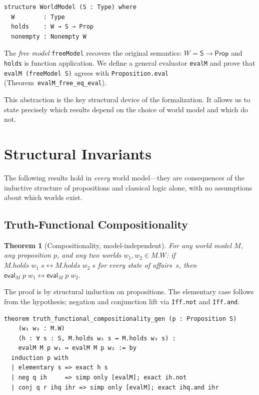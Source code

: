\documentclass[10pt, letterpaper]{article}
\newtheorem{theorem}{Theorem}[section]
\theoremstyle{definition}
\theoremstyle{remark}
\newcommand{\Sach}{\mathsf{S}}
\newcommand{\Prop}{\mathsf{Prop}}
\newcommand{\eval}{\mathsf{eval}}
\begin{document}
\begin{lstlisting}
structure WorldModel (S : Type) where
  W        : Type
  holds    : W → S → Prop
  nonempty : Nonempty W
\end{lstlisting}

\noindent
The \emph{free model} \texttt{freeModel} recovers the original
semantics: $W = \Sach \to \Prop$ and \texttt{holds} is function
application.  We define a general evaluator \texttt{evalM} and
prove that \texttt{evalM (freeModel S)} agrees with
\texttt{Proposition.eval} (Theorem~\texttt{evalM\_free\_eq\_eval}).

This abstraction is the key structural device of the
formalization.  It allows us to state precisely which results
depend on the choice of world model and which do not.

\section{Structural Invariants}
\label{sec:invariants}

The following results hold in \emph{every} world model---they
are consequences of the inductive structure of propositions and
classical logic alone, with no assumptions about which worlds
exist.

\subsection{Truth-Functional Compositionality}
\label{sec:compositionality}

\begin{theorem}[Compositionality, model-independent]
\label{thm:compositionality}
For any world model $M$, any proposition $p$, and any two
worlds $w_1, w_2 \in M.W$: if $M.\mathit{holds}\;w_1\;s
\leftrightarrow M.\mathit{holds}\;w_2\;s$ for every state of
affairs~$s$, then $\eval_M\;p\;w_1 \leftrightarrow
\eval_M\;p\;w_2$.
\end{theorem}

\noindent
The proof is by structural induction on propositions.
The elementary case follows from the hypothesis; negation and
conjunction lift via \texttt{Iff.not} and \texttt{Iff.and}.

\begin{lstlisting}
theorem truth_functional_compositionality_gen (p : Proposition S)
    (w₁ w₂ : M.W)
    (h : ∀ s : S, M.holds w₁ s ↔ M.holds w₂ s) :
    evalM M p w₁ ↔ evalM M p w₂ := by
  induction p with
  | elementary s => exact h s
  | neg q ih     => simp only [evalM]; exact ih.not
  | conj q r ihq ihr => simp only [evalM]; exact ihq.and ihr
\end{lstlisting}
\end{document}

